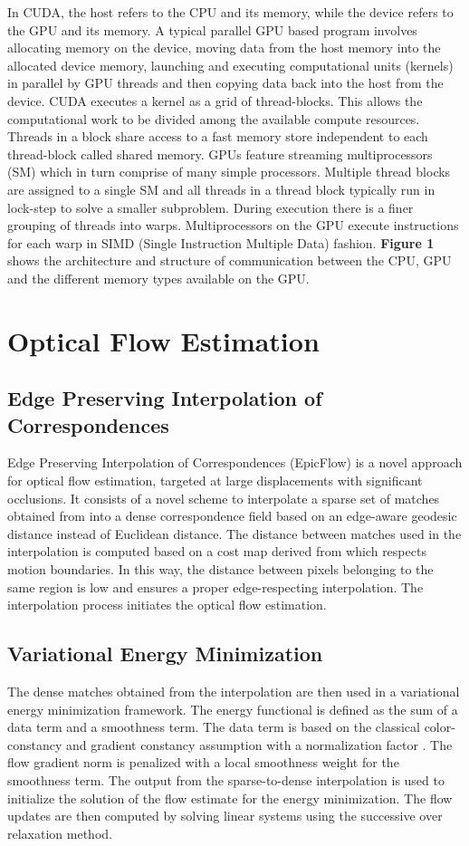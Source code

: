 \documentclass[english]{article}
\begin{document}
	In CUDA, the host refers to the CPU and its memory, while the device refers to the GPU and its memory. A typical parallel GPU based program involves allocating memory on the device, moving data from the host memory into the allocated device memory, launching and executing computational units (kernels) in parallel by GPU threads and then copying data back into the host from the device. CUDA executes a kernel as a grid of thread-blocks. This allows the computational work to be divided among the available compute resources. Threads in a block share access to a fast memory store independent to each thread-block called shared memory. GPUs feature streaming multiprocessors (SM) which in turn comprise of many simple processors. Multiple thread blocks are assigned to a single SM and all threads in a thread block typically run in lock-step to solve a smaller subproblem. During execution there is a finer grouping of threads into warps. Multiprocessors on the GPU execute instructions for each warp in SIMD (Single Instruction Multiple Data) fashion. \textbf{Figure 1} shows the architecture and structure of communication between the CPU, GPU and the different memory types available on the GPU.

	\section{Optical Flow Estimation}
	\subsection{Edge Preserving Interpolation of Correspondences}
	Edge Preserving Interpolation of Correspondences (EpicFlow) \cite{1} is a novel approach for optical flow estimation, targeted at large displacements with significant occlusions. It consists of a novel scheme to interpolate a sparse set of matches obtained from \cite{3} into a dense correspondence field based on an edge-aware geodesic distance instead of Euclidean distance. The distance between matches used in the interpolation is computed based on a cost map derived from \cite{4} which respects motion boundaries. In this way, the distance between pixels belonging to the same region is low and ensures a proper edge-respecting interpolation. The interpolation process initiates the optical flow estimation.

	\subsection{Variational Energy Minimization}
	The dense matches obtained from the interpolation are then used in a variational energy minimization framework. The energy functional is defined as the sum of a data term and a smoothness term. The data term is based on the classical color-constancy and gradient constancy assumption with a normalization factor \cite{5}. The flow gradient norm is penalized with a local smoothness weight for the smoothness term. The output from the sparse-to-dense interpolation is used to initialize the solution of the flow estimate for the energy minimization. The flow updates are then computed by solving linear systems using the successive over relaxation method.
\end{document}
